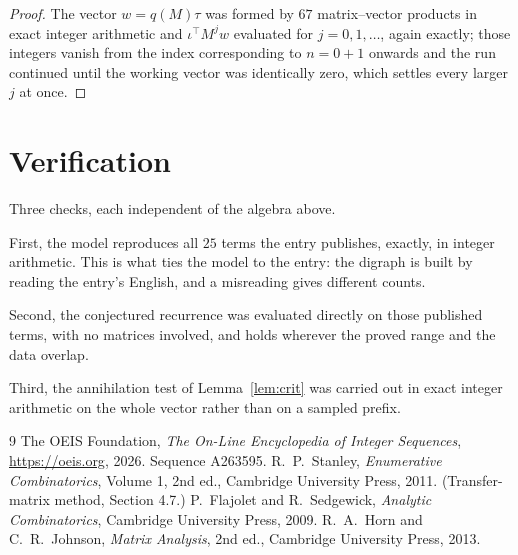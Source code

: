 \documentclass[11pt,a4paper]{article}
\theoremstyle{plain}
\theoremstyle{definition}
\begin{document}
\begin{proof}
The vector $w=q(M)\tau$ was formed by $67$ matrix--vector products in exact integer
arithmetic and $\iota^{\!\top}M^{j}w$ evaluated for $j=0,1,\dots$, again exactly; those
integers vanish from the index corresponding to $n=0+1$ onwards and the run continued
until the working vector was identically zero, which settles every larger $j$ at once.
\end{proof}

\section{Verification}

Three checks, each independent of the algebra above.

First, the model reproduces all $25$ terms the entry publishes, exactly, in integer
arithmetic. This is what ties the model to the entry: the digraph is built by reading the
entry's English, and a misreading gives different counts.

Second, the conjectured recurrence was evaluated directly on those published terms, with no
matrices involved, and holds wherever the proved range and the data overlap.

Third, the annihilation test of Lemma~\ref{lem:crit} was carried out in exact integer
arithmetic on the whole vector rather than on a sampled prefix.

\begin{thebibliography}{9}
 The OEIS Foundation, \emph{The On-Line Encyclopedia of Integer
Sequences}, \url{https://oeis.org}, 2026. Sequence A263595.
 R.~P.~Stanley, \emph{Enumerative Combinatorics}, Volume 1, 2nd ed.,
Cambridge University Press, 2011. (Transfer-matrix method, Section 4.7.)
 P.~Flajolet and R.~Sedgewick, \emph{Analytic Combinatorics}, Cambridge
University Press, 2009.
 R.~A.~Horn and C.~R.~Johnson, \emph{Matrix Analysis}, 2nd ed., Cambridge
University Press, 2013.
\end{thebibliography}
\end{document}
